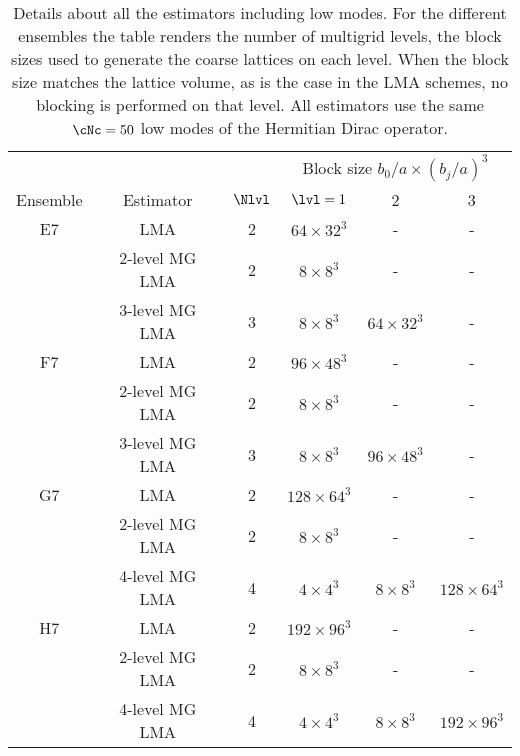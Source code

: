 \begin{table}
\centering
\begin{tabular}{cccccc}
\toprule
         &  &       & \multicolumn{3}{c}{Block size $b_0/a\times(b_j/a)^3$} \\
\cmidrule(lr){4-6}
Ensemble &  Estimator & $\Nlvl$ & $\lvl=1$      & 2 & 3 \\
\midrule
E7 & LMA            & 2 & $64\times32^3$  & -              & -               \\
   & 2-level MG LMA & 2 & $8\times8^3$    & -              & -               \\
   & 3-level MG LMA & 3 & $8\times8^3$    & $64\times32^3$ & -               \\
\midrule
F7 & LMA            & 2 & $96\times48^3$  & -              & -               \\
   & 2-level MG LMA & 2 & $8\times8^3$    & -              & -               \\
   & 3-level MG LMA & 3 & $8\times8^3$    & $96\times48^3$ & -               \\
\midrule
G7 & LMA            & 2 & $128\times64^3$ & -              & -               \\
   & 2-level MG LMA & 2 & $8\times8^3$    & -              & -               \\
   & 4-level MG LMA & 4 & $4\times4^3$    & $8\times8^3$   & $128\times64^3$ \\
\midrule
H7 & LMA            & 2 & $192\times96^3$ & -              & -               \\
   & 2-level MG LMA & 2 & $8\times8^3$    & -              & -               \\
   & 4-level MG LMA & 4 & $4\times4^3$    & $8\times8^3$   & $192\times96^3$ \\
\bottomrule
\end{tabular}
\caption{
Details about all the estimators including low modes.
For the different ensembles the table renders the number of multigrid levels, the block sizes used to generate the coarse lattices on each level.
When the block size matches the lattice volume, as is the case in the LMA schemes, no blocking is performed on that level.
All estimators use the same $\cNc=50$ low modes of the Hermitian Dirac operator.
}
\label{tab:lma:estimators}
\end{table}

